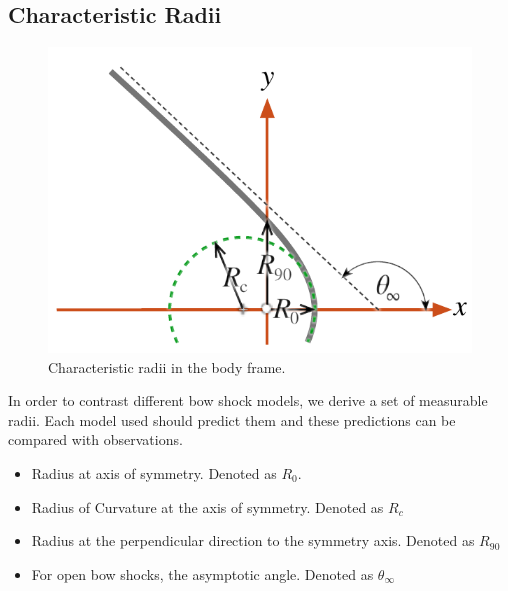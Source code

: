 \subsection{Characteristic Radii}
\begin{figure}
  \centering
  \includegraphics[width=\linewidth]{figs/characteristic-radii}
  \caption{Characteristic radii in the body frame.}
  \label{fig:characteristic-radii}
\end{figure}


In order to contrast different bow shock models, we derive a set of
measurable radii. Each model used should predict them and these
predictions can be compared with observations.
\begin{itemize}
\item Radius at axis of symmetry. Denoted as $R_0$.
\item Radius of Curvature at the axis of symmetry. Denoted as $R_c$
\item Radius at the perpendicular direction to the symmetry
  axis. Denoted as $R_{90}$
\item For open bow shocks, the asymptotic angle. Denoted as
  $\theta_\infty$
\end{itemize}







